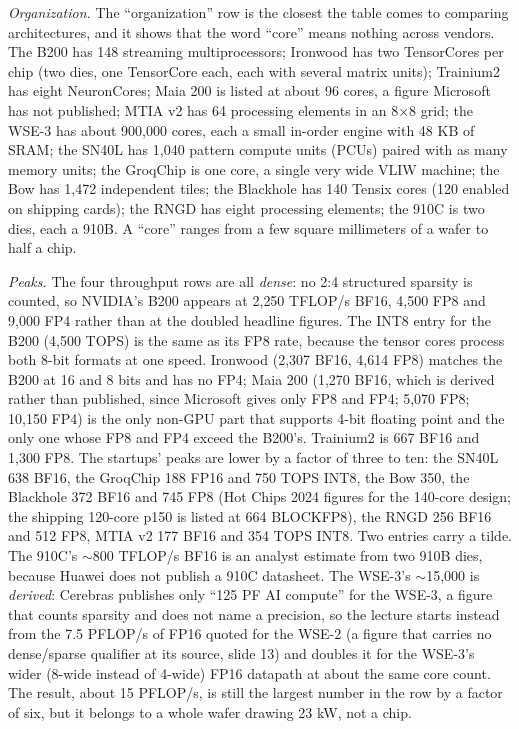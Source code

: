 \documentclass[11pt,letterpaper]{article}
\begin{document}
\emph{Organization.} The ``organization'' row is the closest the table comes to comparing architectures, and it shows that the word ``core'' means nothing across vendors. The B200 has 148 streaming multiprocessors; Ironwood has two TensorCores per chip (two dies, one TensorCore each, each with several matrix units); Trainium2 has eight NeuronCores; Maia 200 is listed at about 96 cores, a figure Microsoft has not published; MTIA v2 has 64 processing elements in an 8$\times$8 grid; the WSE-3 has about 900{,}000 cores, each a small in-order engine with 48 KB of SRAM; the SN40L has 1{,}040 pattern compute units (PCUs) paired with as many memory units; the GroqChip is one core, a single very wide VLIW machine; the Bow has 1{,}472 independent tiles; the Blackhole has 140 Tensix cores (120 enabled on shipping cards); the RNGD has eight processing elements; the 910C is two dies, each a 910B. A ``core'' ranges from a few square millimeters of a wafer to half a chip.

\emph{Peaks.} The four throughput rows are all \emph{dense}: no 2:4 structured sparsity is counted, so NVIDIA's B200 appears at 2{,}250 TFLOP/s BF16, 4{,}500 FP8 and 9{,}000 FP4 rather than at the doubled headline figures. The INT8 entry for the B200 (4{,}500 TOPS) is the same as its FP8 rate, because the tensor cores process both 8-bit formats at one speed. Ironwood (2{,}307 BF16, 4{,}614 FP8) matches the B200 at 16 and 8 bits and has no FP4; Maia 200 (1{,}270 BF16, which is derived rather than published, since Microsoft gives only FP8 and FP4; 5{,}070 FP8; 10{,}150 FP4) is the only non-GPU part that supports 4-bit floating point and the only one whose FP8 and FP4 exceed the B200's. Trainium2 is 667 BF16 and 1{,}300 FP8. The startups' peaks are lower by a factor of three to ten: the SN40L 638 BF16, the GroqChip 188 FP16 and 750 TOPS INT8, the Bow 350, the Blackhole 372 BF16 and 745 FP8 (Hot Chips 2024 figures for the 140-core design; the shipping 120-core p150 is listed at 664 BLOCKFP8), the RNGD 256 BF16 and 512 FP8, MTIA v2 177 BF16 and 354 TOPS INT8. Two entries carry a tilde. The 910C's ${\sim}$800 TFLOP/s BF16 is an analyst estimate from two 910B dies, because Huawei does not publish a 910C datasheet. The WSE-3's ${\sim}$15{,}000 is \emph{derived}: Cerebras publishes only ``125 PF AI compute'' for the WSE-3, a figure that counts sparsity and does not name a precision, so the lecture starts instead from the 7.5 PFLOP/s of FP16 quoted for the WSE-2 (a figure that carries no dense/sparse qualifier at its source, slide 13) and doubles it for the WSE-3's wider (8-wide instead of 4-wide) FP16 datapath at about the same core count. The result, about 15 PFLOP/s, is still the largest number in the row by a factor of six, but it belongs to a whole wafer drawing 23 kW, not a chip.
\end{document}

